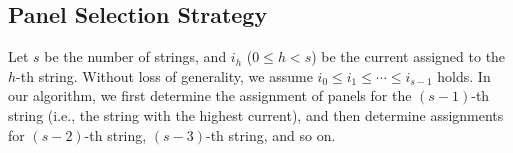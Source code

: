 \documentclass[conference]{IEEEtran}
\begin{document}
\subsection{Panel Selection Strategy} \label{selection strategy}
Let $s$ be the number of strings, and $i_h$ ($0\le h<s$) be the current assigned to the $h$-th string. Without loss of generality, we assume $i_0\le i_1\le \cdots \le i_{s-1}$ holds. In our algorithm, we first determine the assignment of panels for the $(s-1)$-th string (i.e., the string with the highest current), and then determine assignments for $(s-2)$-th string, $(s-3)$-th string, and so on.
\end{document}
